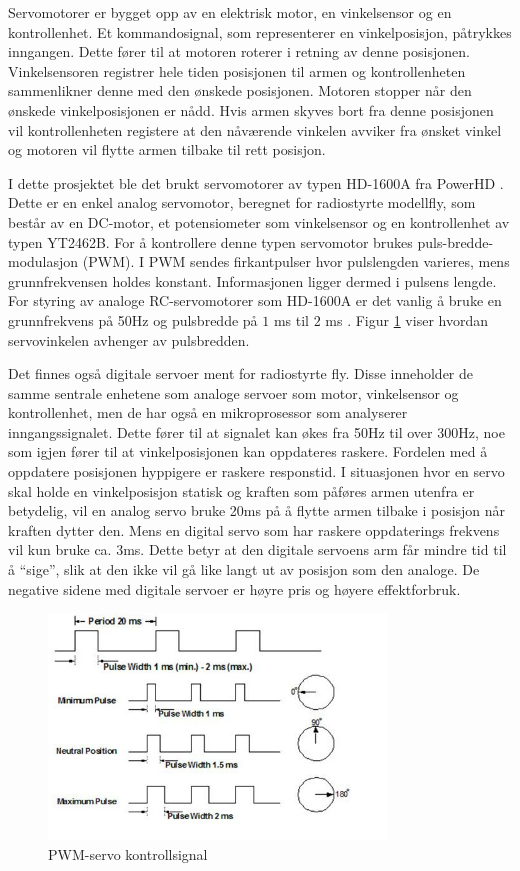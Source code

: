 Servomotorer er bygget opp av en elektrisk motor, en vinkelsensor og en kontrollenhet. Et kommandosignal, som representerer en vinkelposisjon, påtrykkes inngangen. Dette fører til at motoren roterer i retning av denne posisjonen. Vinkelsensoren registrer hele tiden posisjonen til armen og kontrollenheten sammenlikner denne med den ønskede posisjonen. Motoren stopper når den ønskede vinkelposisjonen er nådd. Hvis armen skyves bort fra denne posisjonen vil kontrollenheten registere at den nåværende vinkelen avviker fra ønsket vinkel og motoren vil flytte armen tilbake til rett posisjon. 

I dette prosjektet ble det brukt servomotorer av typen HD-1600A fra PowerHD \cite{PowerHD}. Dette er en enkel analog servomotor, beregnet for radiostyrte modellfly, som består av en DC-motor, et potensiometer som vinkelsensor og en kontrollenhet av typen YT2462B. For å kontrollere denne typen servomotor brukes puls-bredde-modulasjon (PWM). I PWM sendes firkantpulser hvor pulslengden varieres, mens grunnfrekvensen holdes konstant. Informasjonen ligger dermed i pulsens lengde. For styring av analoge RC-servomotorer som HD-1600A er det vanlig å bruke en grunnfrekvens på 50Hz og pulsbredde på $1$ ms til $2$ ms \cite{PCBheaven}. Figur \ref{fig:PWM} viser hvordan servovinkelen avhenger av pulsbredden.

Det finnes også digitale servoer ment for radiostyrte fly. Disse inneholder de samme sentrale enhetene som analoge servoer som motor, vinkelsensor og kontrollenhet, men de har også en mikroprosessor som analyserer inngangssignalet. Dette fører til at signalet kan økes fra 50Hz til over 300Hz, noe som igjen fører til at vinkelposisjonen kan oppdateres raskere. Fordelen med å oppdatere posisjonen hyppigere er raskere responstid. I situasjonen hvor en servo skal holde en vinkelposisjon statisk og kraften som påføres armen utenfra er betydelig, vil en analog servo bruke 20ms på å flytte armen tilbake i posisjon når kraften dytter den. Mens en digital servo som har raskere oppdaterings frekvens vil kun bruke ca. 3ms. Dette betyr at den digitale servoens arm får mindre tid til å ``sige'', slik at den ikke vil gå like langt ut av posisjon som den analoge. De negative sidene med digitale servoer er høyre pris og høyere effektforbruk.    

\begin{figure}[H]
\centering
\includegraphics[width=0.8\textwidth]{img/pwm_servo.jpg}
\caption{PWM-servo kontrollsignal \cite{PWM}}
\label{fig:PWM}
\end{figure}   

